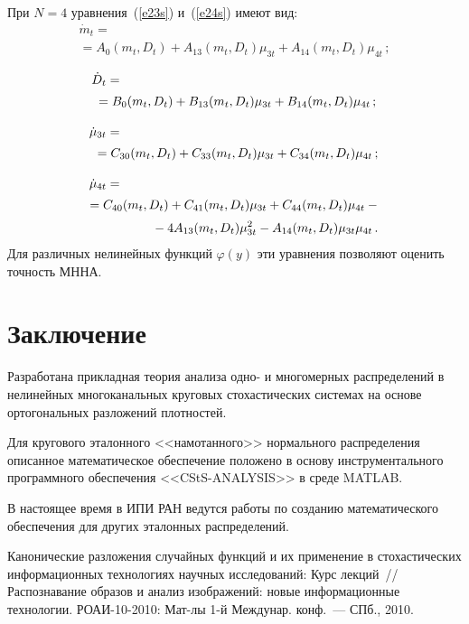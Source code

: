 \begin{multicols}{2}
При $N=4$ уравнения~(\ref{e23s}) и~(\ref{e24s}) имеют вид:
\begin{multline*}
\dot m_t ={}\\
{}=  A_0 (m_t, D_t)+A_{13} (m_t, D_t)\mu_{3t} +A_{14} (m_t, D_t)\mu_{4t}\,;
\end{multline*}

\noindent
\begin{align*}
\dot D_t &={}\\[2pt]
&\hspace{-9pt}{}=B_0 (m_t, D_t)+B_{13} (m_t, D_t)\mu_{3t}+B_{14} (m_t, D_t) \mu_{4t}\,;\\[9pt]
\dot \mu_{3t} &={}\\[2pt]
&\hspace{-10pt}{}= C_{30}(m_t, D_t)+ C_{33}(m_t, D_t)\mu_{3t}+C_{34}(m_t, D_t) \mu_{4t}\,;\\[9pt]
\dot \mu_{4t} &={}\\[2pt]
&\hspace*{-16pt}{}= C_{40}(m_t, D_t)+ C_{41}(m_t, D_t)\mu_{3t}+C_{44}(m_t, D_t) \mu_{4t} -{}\\[2pt]
&\hspace*{36pt}{}- 4 A_{13} (m_t, D_t) \mu_{3t}^2 -A_{14} (m_t, D_t) \mu_{3t}\mu_{4t}\,.
\end{align*}
%
Для различных нелинейных функций $\varphi(y)$ эти урав\-не\-ния
позволяют оценить точность МННА.

\section{Заключение}

Разработана прикладная тео\-рия анализа одно- и многомерных распределений в 
нелинейных многоканальных круговых стохастических системах на основе ортогональных 
разложений плотностей.

Для кругового эталонного <<намотанного>> нормаль\-но\-го распределения 
описанное математическое обеспечение положено в основу инструментального 
программного обеспечения <<CStS-ANALYSIS>> в среде MATLAB.

В настоящее время в ИПИ РАН ведутся работы по созданию математического обеспечения для 
других эталонных распределений.

{\small\frenchspacing
{%
\begin{thebibliography}{9}
Канонические разложения случайных функций и их применение в стохастических информационных 
технологиях научных исследований: Курс лекций~// Распознавание образов и анализ изображений: 
новые информационные технологии. РОАИ-10-2010: Мат-лы 1-й Междунар. конф.~--- СПб., 2010.


\end{thebibliography}}}
\end{multicols}
